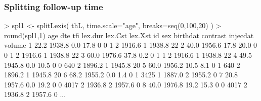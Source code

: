 \begin{frame}[fragile]
  \frametitle{Splitting follow-up time}
\footnotesize
\renewcommand{\baselinestretch}{0.9}
\begin{semiverbatim}
> spl1 <- splitLexis( thL, time.scale="age", breaks=seq(0,100,20) )
> round(spl1,1)
   age    dte  tfi lex.dur lex.Cst lex.Xst   id sex birthdat contrast injecdat volume
\alert<2>{1 22.2 1938.8  0.0    17.8       0       0    1   2   1916.6        1   1938.8     22}
\alert<2>{2 40.0 1956.6 17.8    20.0       0       0    1   2   1916.6        1   1938.8     22}
\alert<2>{3 60.0 1976.6 37.8     0.2       0       1    1   2   1916.6        1   1938.8     22}
\alert<3>{4 49.5 1945.8  0.0    10.5       0       0  640   2   1896.2        1   1945.8     20}
\alert<3>{5 60.0 1956.2 10.5     8.1       0       1  640   2   1896.2        1   1945.8     20}
\alert<4>{6 68.2 1955.2  0.0     1.4       0       1 3425   1   1887.0        2   1955.2      0}
\alert<5>{7 20.8 1957.6  0.0    19.2       0       0 4017   2   1936.8        2   1957.6      0}
\alert<5>{8 40.0 1976.8 19.2    15.3       0       0 4017   2   1936.8        2   1957.6      0}
...
\end{semiverbatim}
\renewcommand{\baselinestretch}{1.0}

\end{frame}

